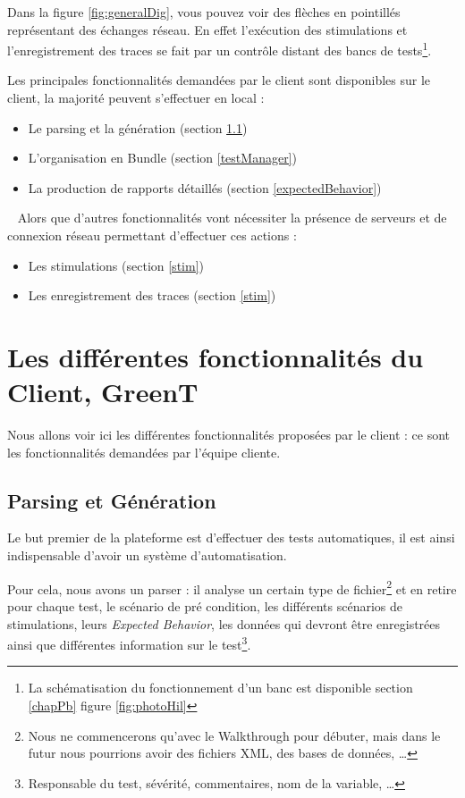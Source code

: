 		Dans la figure \ref{fig:generalDig}, vous pouvez voir des flèches en pointillés représentant des échanges réseau. En effet
		l'exécution des stimulations et l'enregistrement des traces se fait par un contrôle distant des bancs de tests\footnote{La
		schématisation du fonctionnement d'un banc est disponible section \ref{chapPb} figure \ref{fig:photoHil}}.

		Les principales fonctionnalités demandées par le client sont disponibles sur le client, la majorité peuvent s'effectuer en local : 
		\begin{itemize}
			\item Le parsing et la génération (section \ref{generation})
			\item L'organisation en Bundle (section \ref{testManager})
			\item La production de rapports détaillés (section \ref{expectedBehavior})
		\end{itemize}~\newline
		Alors que d'autres fonctionnalités vont nécessiter la présence de serveurs et de connexion réseau permettant d'effectuer ces actions
		: 
		\begin{itemize}
			\item Les stimulations (section \ref{stim})
			\item Les enregistrement des traces (section \ref{stim})
		\end{itemize}

		\section{Les différentes fonctionnalités du Client, GreenT}
		Nous allons voir ici les différentes fonctionnalités proposées par le client : ce sont les fonctionnalités demandées par l'équipe
		cliente.
			
	\subsection{Parsing et Génération}\label{generation}
	Le but premier de la plateforme est d'effectuer des tests automatiques, il est ainsi indispensable d'avoir un système d'automatisation.

	Pour cela, nous avons un parser : il analyse un certain type de fichier\footnote{Nous ne commencerons qu'avec le Walkthrough pour débuter, mais dans le futur nous pourrions avoir des fichiers XML, des bases de données, \ldots} et en retire pour chaque test, le scénario de pré condition, les différents scénarios de stimulations, leurs \textit{Expected Behavior}, les données qui devront être enregistrées ainsi que différentes information sur le test\footnote{Responsable du test, sévérité, commentaires, nom de la variable, \ldots}.

